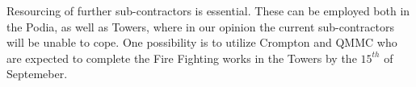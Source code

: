 Resourcing of further sub-contractors is essential. These can be employed both in the Podia, as well as Towers, where in our opinion the current sub-contractors will be unable to cope. One possibility is to utilize Crompton and QMMC who are expected to complete the Fire Fighting works in the Towers by the $15^{th}$ of Septemeber.






